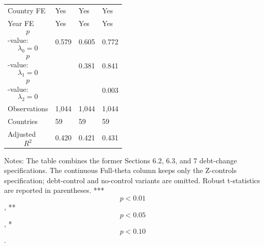 \begin{table}[H]
\begin{threeparttable}
\begin{tabularx}{\textwidth}{lYYY}
Country FE & Yes & Yes & Yes \\
Year FE & Yes & Yes & Yes \\
$$p$$-value: $$\lambda_0=0$$ & 0.579 & 0.605 & 0.772 \\
$$p$$-value: $$\lambda_1=0$$ &  & 0.381 & 0.841 \\
$$p$$-value: $$\lambda_2=0$$ &  &  & 0.003 \\
Observations & 1,044 & 1,044 & 1,044 \\
Countries & 59 & 59 & 59 \\
Adjusted $$R^2$$ & 0.420 & 0.421 & 0.431 \\
\bottomrule
\end{tabularx}
\begin{tablenotes}[flushleft]\footnotesize
\item Notes: The table combines the former Sections 6.2, 6.3, and 7 debt-change specifications. The continuous Full-theta column keeps only the Z-controls specification; debt-control and no-control variants are omitted. Robust t-statistics are reported in parentheses. *** $$p<0.01$$, ** $$p<0.05$$, * $$p<0.10$$.
\end{tablenotes}
\end{threeparttable}
\end{table}
